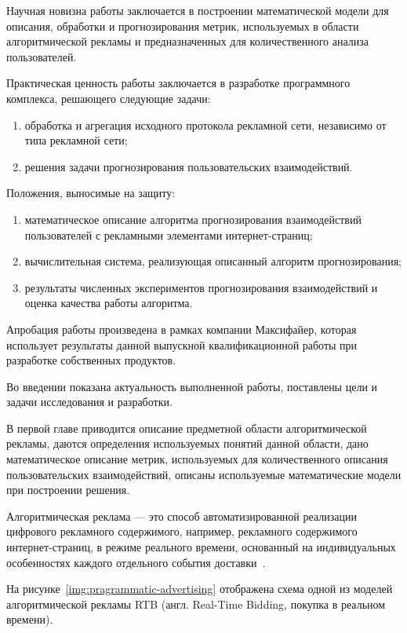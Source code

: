 \documentclass[a4paper, 14pt, oneside]{extarticle}
\begin{document}
    Научная новизна работы заключается в построении математической модели для описания, обработки и прогнозирования
    метрик, используемых в области алгоритмической рекламы и предназначенных для количественного анализа пользователей.

    Практическая ценность работы заключается в разработке программного комплекса, решающего следующие задачи:
    \begin{enumerate}
        \item обработка и агрегация исходного протокола рекламной сети, независимо от типа рекламной сети;
        \item решения задачи прогнозирования пользовательских взаимодействий.
    \end{enumerate}

    Положения, выносимые на защиту:
    \begin{enumerate}
        \item математическое описание алгоритма прогнозирования взаимодействий пользователей с рекламными элементами интернет-страниц;
        \item вычислительная система, реализующая описанный алгоритм прогнозирования;
        \item результаты численных экспериментов прогнозирования взаимодействий и оценка качества работы алгоритма.
    \end{enumerate}

    Апробация работы произведена в рамках компании Максифайер, которая использует результаты
    данной выпускной квалификационной работы при разработке собственных продуктов.
    \\
    
    
    Во введении показана актуальность выполненной работы, поставлены цели и задачи исследования и разработки.

    В первой главе приводится описание предметной области алгоритмической рекламы, даются определения
    используемых понятий данной области, дано математическое описание метрик, используемых
    для количественного описания пользовательских взаимодействий, описаны используемые математические модели при построении решения.

    Алгоритмическая реклама --- это способ автоматизированной реализации цифрового рекламного содержимого,
    например, рекламного содержимого интернет-страниц, в режиме реального времени, основанный на индивидуальных 
    особенностях каждого отдельного события доставки~\autocite*[]{online:programmatic}.
    
    На рисунке~\ref{img:pragrammatic-advertising} отображена схема одной из моделей алгоритмической рекламы
    RTB (англ. Real-Time Bidding, покупка в реальном времени).
\end{document}
